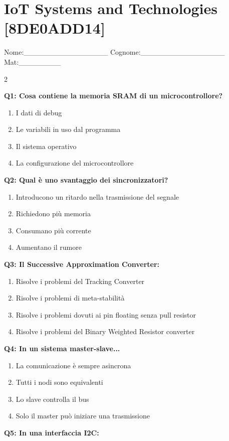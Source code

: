 \documentclass[10pt]{article}
\begin{document}
\section*{IoT Systems and Technologies \footnotesize [8DE0ADD14]}
{\footnotesize Nome:\_\_\_\_\_\_\_\_\_\_\_\_\_\_\_\_ Cognome:\_\_\_\_\_\_\_\_\_\_\_\_\_\_\_\_ Mat:\_\_\_\_\_\_\_\_}
\begin{multicols}{2}

\textbf{Q1: Cosa contiene la memoria SRAM di un microcontrollore?}

\begin{enumerate}[label=\arabic*.]
\item I dati di debug
\item Le variabili in uso dal programma
\item Il sistema operativo
\item La configurazione del microcontrollore
\end{enumerate}
\textbf{Q2: Qual è uno svantaggio dei sincronizzatori?}

\begin{enumerate}[label=\arabic*.]
\item Introducono un ritardo nella trasmissione del segnale
\item Richiedono più memoria
\item Consumano più corrente
\item Aumentano il rumore
\end{enumerate}
\textbf{Q3: Il Successive Approximation Converter:}

\begin{enumerate}[label=\arabic*.]
\item Risolve i problemi del Tracking Converter
\item Risolve i problemi di meta-stabilità
\item Risolve i problemi dovuti ai pin floating senza pull resistor
\item Risolve i problemi del Binary Weighted Resistor converter
\end{enumerate}
\textbf{Q4: In un sistema master-slave...}

\begin{enumerate}[label=\arabic*.]
\item La comunicazione è sempre asincrona
\item Tutti i nodi sono equivalenti
\item Lo slave controlla il bus
\item Solo il master può iniziare una trasmissione
\end{enumerate}
\textbf{Q5: In una interfaccia I2C:}


\end{multicols}
\end{document}
